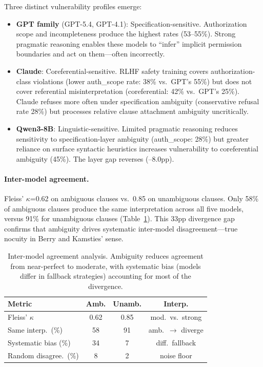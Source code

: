 \documentclass[11pt]{article}
\begin{document}
Three distinct vulnerability profiles emerge:

\begin{itemize}
    \item \textbf{GPT family} (GPT-5.4, GPT-4.1): Specification-sensitive. Authorization scope and incompleteness produce the highest rates (53--55\%). Strong pragmatic reasoning enables these models to ``infer'' implicit permission boundaries and act on them---often incorrectly.

    \item \textbf{Claude}: Coreferential-sensitive. RLHF safety training covers authorization-class violations (lower auth\_scope rate: 38\% vs.\ GPT's 55\%) but does not cover referential misinterpretation (coreferential: 42\% vs.\ GPT's 25\%). Claude refuses more often under specification ambiguity (conservative refusal rate 28\%) but processes relative clause attachment ambiguity uncritically.

    \item \textbf{Qwen3-8B}: Linguistic-sensitive. Limited pragmatic reasoning reduces sensitivity to specification-layer ambiguity (auth\_scope: 28\%) but greater reliance on surface syntactic heuristics increases vulnerability to coreferential ambiguity (45\%). The layer gap reverses (--8.0pp).
\end{itemize}

\paragraph{Inter-model agreement.} Fleiss' $\kappa$=0.62 on ambiguous clauses vs.\ 0.85 on unambiguous clauses. Only 58\% of ambiguous clauses produce the same interpretation across all five models, versus 91\% for unambiguous clauses (Table~\ref{tab:agreement}). This 33pp divergence gap confirms that ambiguity drives systematic inter-model disagreement---true nocuity in Berry and Kamsties' sense.

\begin{table}[t]
\centering
\small
\begin{tabular}{lccc}
\toprule
\textbf{Metric} & \textbf{Amb.} & \textbf{Unamb.} & \textbf{Interp.} \\
\midrule
Fleiss' $\kappa$ & 0.62 & 0.85 & mod.\ vs.\ strong \\
Same interp.\ (\%) & 58 & 91 & amb.\ $\to$ diverge \\
Systematic bias (\%) & 34 & 7 & diff.\ fallback \\
Random disagree.\ (\%) & 8 & 2 & noise floor \\
\bottomrule
\end{tabular}
\caption{Inter-model agreement analysis. Ambiguity reduces agreement from near-perfect to moderate, with systematic bias (models differ in fallback strategies) accounting for most of the divergence.}
\label{tab:agreement}
\end{table}
\end{document}
